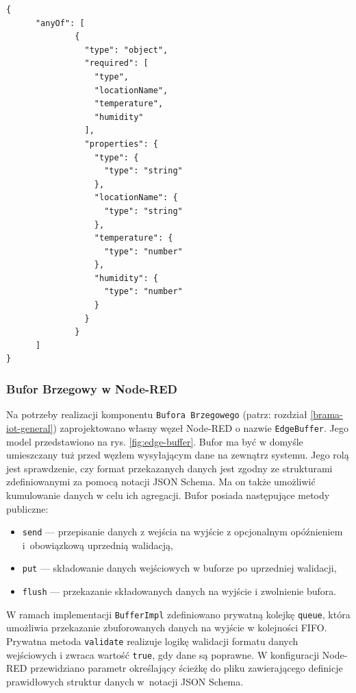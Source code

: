 \documentclass[a4paper, 12pt, twoside]{article}
\begin{document}
\begin{lstlisting}[caption={Przykład definicji obiektu JSON w notacji JSON Schema dla 
      struktury \texttt{AirMeasurement}}, label={lst:json-schema}]
{
      "anyOf": [
              {
                "type": "object",
                "required": [
                  "type",
                  "locationName",
                  "temperature",
                  "humidity"
                ],
                "properties": {
                  "type": {
                    "type": "string"
                  },
                  "locationName": {
                    "type": "string"
                  },
                  "temperature": {
                    "type": "number"
                  },
                  "humidity": {
                    "type": "number"
                  }
                }
              }
      ]
}    
\end{lstlisting}

\subsubsection{Bufor Brzegowy w Node-RED}
Na potrzeby realizacji komponentu \texttt{Bufora Brzegowego} (patrz: rozdział \ref{brama-iot-general})
zaprojektowano własny węzeł Node-RED o nazwie \texttt{EdgeBuffer}.
Jego model przedstawiono na rys. \ref{fig:edge-buffer}.
Bufor ma być w domyśle umieszczany tuż przed węzłem wysyłającym dane na
zewnątrz systemu. Jego rolą jest sprawdzenie, czy format
przekazanych danych jest zgodny ze strukturami zdefiniowanymi za pomocą notacji JSON Schema.
Ma on także umożliwić
kumulowanie danych w celu ich agregacji. Bufor posiada następujące
metody publiczne:
\begin{itemize}
      \itemsep0em
      \item \texttt{send} --- przepisanie danych z wejścia na wyjście z
            opcjonalnym opóźnieniem i~obowiązkową uprzednią walidacją,
      \item \texttt{put} --- składowanie danych wejściowych w buforze po uprzedniej walidacji,
      \item \texttt{flush} --- przekazanie składowanych danych na wyjście
            i zwolnienie bufora.
\end{itemize}
\noindent W ramach implementacji \texttt{BufferImpl} zdefiniowano
prywatną kolejkę \texttt{queue}, która umożliwia przekazanie zbuforowanych
danych na wyjście w kolejności FIFO. Prywatna metoda \texttt{validate} realizuje
logikę walidacji formatu danych wejściowych i zwraca wartość \texttt{true},
gdy dane są poprawne. W konfiguracji Node-RED przewidziano parametr określający
ścieżkę do pliku zawierającego definicje prawidłowych struktur danych w~notacji JSON Schema.
\end{document}
